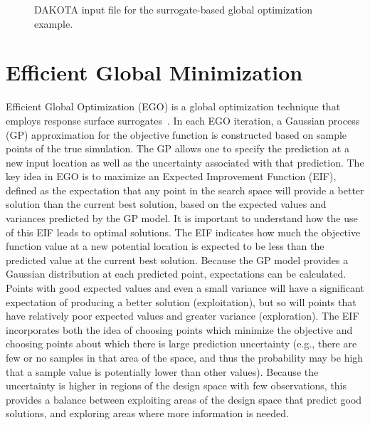 \begin{figure}
  \begin{bigbox}
    \begin{tiny}
    \end{tiny}
  \end{bigbox}
  \caption{DAKOTA input file for the surrogate-based global optimization
    example.}
  \label{sbm:sbgm_moga}
\end{figure}
 
\section{Efficient Global Minimization}\label{sbm:egm}

Efficient Global Optimization (EGO) is a global optimization technique
that employs response surface surrogates~\cite{Jon98,Hua06}.  In each
EGO iteration, a Gaussian process (GP) approximation for the objective
function is constructed based on sample points of the true simulation.
The GP allows one to specify the prediction at a new input location as
well as the uncertainty associated with that prediction.  The key idea
in EGO is to maximize an Expected Improvement Function (EIF), defined
as the expectation that any point in the search space will provide a
better solution than the current best solution, based on the expected
values and variances predicted by the GP model.  It is important to
understand how the use of this EIF leads to optimal solutions.  The
EIF indicates how much the objective function value at a new potential
location is expected to be less than the predicted value at the
current best solution.  Because the GP model provides a Gaussian
distribution at each predicted point, expectations can be calculated.
Points with good expected values and even a small variance will have a
significant expectation of producing a better solution (exploitation),
but so will points that have relatively poor expected values and
greater variance (exploration).  The EIF incorporates both the idea of
choosing points which minimize the objective and choosing points about
which there is large prediction uncertainty (e.g., there are few or no
samples in that area of the space, and thus the probability may be
high that a sample value is potentially lower than other values).
Because the uncertainty is higher in regions of the design space with
few observations, this provides a balance between exploiting areas of
the design space that predict good solutions, and exploring areas
where more information is needed.

